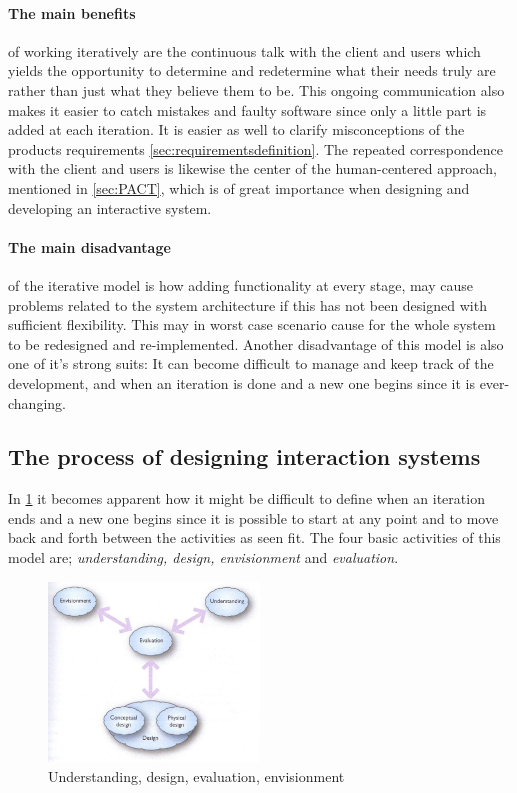\paragraph{The main benefits}
of working iteratively are the continuous talk with the client and users which yields the opportunity to determine and redetermine what their needs truly are rather than just what they believe them to be.
This ongoing communication also makes it easier to catch mistakes and faulty software since only a little part is added at each iteration.
It is easier as well to clarify misconceptions of the products requirements \cref{sec:requirementsdefinition}.
The repeated correspondence with the client and users is likewise the center of the human-centered approach, mentioned in \cref{sec:PACT}, which is of great importance when designing and developing an interactive system.

\paragraph{The main disadvantage} of the iterative model is how adding functionality at every stage, may cause problems related to the system architecture 
if this has not been designed with sufficient flexibility.
This may in worst case scenario cause for the whole system to be redesigned and re-implemented.
Another disadvantage of this model is also one of it's strong suits:
It can become difficult to manage and keep track of the development, and when an iteration is done and a new one begins since it is ever-changing.

\subsection{The process of designing interaction systems}\label{sec:Iterative1}
In \cref{fig:DEBModel} it becomes apparent how it might be difficult to define when an iteration ends and a new one begins since it is possible to start at any point and to move back and forth between the activities as seen fit.
The four basic activities of this model are; \textit{understanding, design, envisionment} and \textit{evaluation}.

\begin{figure}[H]
	\centering
	\includegraphics[width=0.5\textwidth]{billeder/DEBModel.jpg}
	\caption{Understanding, design, evaluation, envisionment \citep[p.~49]{Benyon}}\label{fig:DEBModel}
\end{figure}

